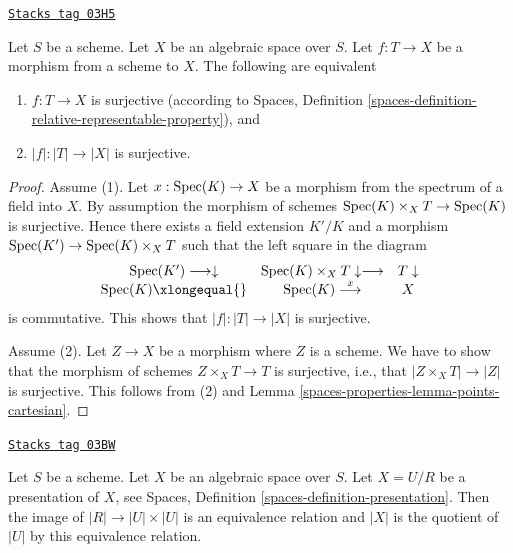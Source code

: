 \begin{lemma}
\label{spaces-properties-lemma-characterize-surjective}
\href{https://stacks.math.columbia.edu/tag/03H5}{\texttt{Stacks tag 03H5}}

Let $S$ be a scheme.
Let $X$ be an algebraic space over $S$.
Let $f : T \to X$ be a morphism from a scheme to $X$.
The following are equivalent
\begin{enumerate}
\item $f : T \to X$ is surjective (according to
Spaces, Definition \ref{spaces-definition-relative-representable-property}),
and
\item $|f| : |T| \to |X|$ is surjective.
\end{enumerate}
\end{lemma}

\begin{proof}
Assume (1). Let $x : \operatorname{Spec}(K) \to X$ be a morphism
from the spectrum of a field into $X$. By assumption the morphism of
schemes $\operatorname{Spec}(K) \times_X T \to \operatorname{Spec}(K)$ is surjective.
Hence there exists a field extension $K'/K$ and a morphism
$\operatorname{Spec}(K') \to \operatorname{Spec}(K) \times_X T$ such that the left
square in the diagram
$$
\begin{array}{ccc}\Spec(K') \longrightarrow\downarrow & \Spec(K) \times_X T \downarrow\longrightarrow & T \downarrow \\ \Spec(K) \xlongequal{} & \Spec(K) \overset{x}{\longrightarrow} & X\end{array}
$$
is commutative. This shows that $|f| : |T| \to |X|$ is surjective.

\medskip\noindent
Assume (2). Let $Z \to X$ be a morphism where $Z$ is
a scheme. We have to show that the morphism of schemes $Z \times_X T \to T$
is surjective, i.e., that $|Z \times_X T| \to |Z|$ is surjective.
This follows from (2) and
Lemma \ref{spaces-properties-lemma-points-cartesian}.
\end{proof}

\begin{lemma}
\label{spaces-properties-lemma-points-presentation}
\href{https://stacks.math.columbia.edu/tag/03BW}{\texttt{Stacks tag 03BW}}

Let $S$ be a scheme.
Let $X$ be an algebraic space over $S$.
Let $X = U/R$ be a presentation of $X$, see
Spaces, Definition \ref{spaces-definition-presentation}.
Then the image of $|R| \to |U| \times |U|$ is an equivalence relation
and $|X|$ is the quotient of $|U|$ by this equivalence relation.
\end{lemma}

